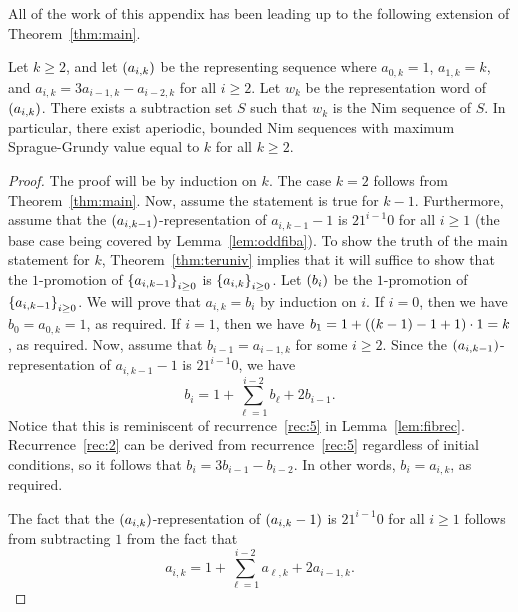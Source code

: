 \documentclass[english,12pt]{article}
\newcommand{\seq}{\p}
\begin{document}
All of the work of this appendix has been leading up to the following extension of Theorem~\ref{thm:main}.
\begin{theorem}\label{thm:mainext}
Let $k\geq2$, and let $\seq{a_{i,k}}$ be the representing sequence where $a_{0,k}=1$, $a_{1,k}=k$, and $a_{i,k}=3a_{i-1,k}-a_{i-2,k}$ for all $i\geq2$.  Let $w_k$ be the representation word of $\seq{a_{i,k}}$.  There exists a subtraction set $S$ such that $w_k$ is the Nim sequence of $S$.  In particular, there exist aperiodic, bounded Nim sequences with maximum Sprague-Grundy value equal to $k$ for all $k\geq2$.
\end{theorem}
\begin{proof}
The proof will be by induction on $k$.  The case $k=2$ follows from Theorem~\ref{thm:main}.  Now, assume the statement is true for $k-1$.  Furthermore, assume that the $\seq{a_{i,k-1}}$-representation of $a_{i,k-1}-1$ is $21^{i-1}0$ for all $i\geq1$ (the base case being covered by Lemma~\ref{lem:oddfiba}).  To show the truth of the main statement for $k$, Theorem~\ref{thm:teruniv} implies that it will suffice to show that the $1$-promotion of $\left\{a_{i,k-1}\right\}_{i\geq0}$ is $\left\{a_{i,k}\right\}_{i\geq0}$.  Let $\seq{b_i}$ be the $1$-promotion of $\left\{a_{i,k-1}\right\}_{i\geq0}$. We will prove that $a_{i,k}=b_i$ by induction on $i$.  If $i=0$, then we have $b_0=a_{0,k}=1$, as required.  If $i=1$, then we have $b_1=1+\left(\left(k-1\right)-1+1\right)\cdot1=k$, as required.  Now, assume that $b_{i-1}=a_{i-1,k}$ for some $i\geq2$.  Since the $\seq{a_{i,k-1}}$-representation of $a_{i,k-1}-1$ is $21^{i-1}0$, we have
\[
b_i=1+\sum_{\ell=1}^{i-2}b_\ell+2b_{i-1}.
\]
Notice that this is reminiscent of recurrence~\ref{rec:5} in Lemma~\ref{lem:fibrec}.  Recurrence~\ref{rec:2} can be derived from recurrence~\ref{rec:5} regardless of initial conditions, so it follows that $b_i=3b_{i-1}-b_{i-2}$.  In other words, $b_i=a_{i,k}$, as required.

The fact that the $\seq{a_{i,k}}$-representation of $\seq{a_{i,k}-1}$ is $21^{i-1}0$ for all $i\geq1$ follows from subtracting $1$ from the fact that
\[
a_{i,k}=1+\sum_{\ell=1}^{i-2}a_{\ell,k}+2a_{i-1,k}.
\]
\end{proof}
\end{document}
